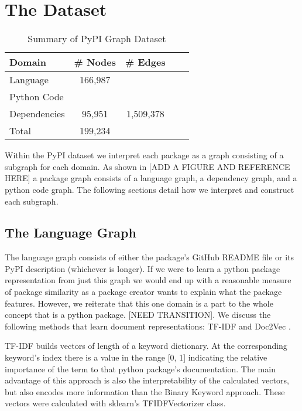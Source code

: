 \documentclass{article}
\begin{document}
\section{The Dataset}

\begin{table}[t]
\caption{Summary of PyPI Graph Dataset}
\label{sample-table}
\vskip 0.15in
\begin{center}
\begin{small}
\begin{sc}
\begin{tabular}{lcccr}
\toprule
Domain & \# Nodes & \# Edges\\
\midrule
Language     & 166,987 & & \\
Python Code  & & & \\
Dependencies & 95,951 & 1,509,378 & \\
Total        & 199,234 & & \\
\bottomrule
\end{tabular}
\end{sc}
\end{small}
\end{center}
\vskip -0.15in
\end{table}

Within the PyPI dataset we interpret each package as a graph consisting of a subgraph for each domain. As shown in [ADD A FIGURE AND REFERENCE HERE] a package graph consists of a language graph, a dependency graph, and a python code graph. The following sections detail how we interpret and construct each subgraph.

\subsection{The Language Graph}

The language graph consists of either the package's GitHub README file or its PyPI description (whichever is longer). If we were to learn a python package representation from just this graph we would end up with a reasonable measure of package similarity as a package creator wants to explain what the package features. However, we reiterate that this one domain is a part to the whole concept that is a python package. [NEED TRANSITION]. We discuss the following methods that learn document representations: TF-IDF and Doc2Vec \cite{doc2vec}.

 TF-IDF builds vectors of length of a keyword dictionary. At the corresponding keyword’s index there is a value in the range [0, 1] indicating the relative importance of the term to that python package’s documentation. The main advantage of this approach is also the interpretability of the calculated vectors, but also encodes more information than the Binary Keyword approach. These vectors were calculated with sklearn’s TFIDFVectorizer class.
 
\end{document}
